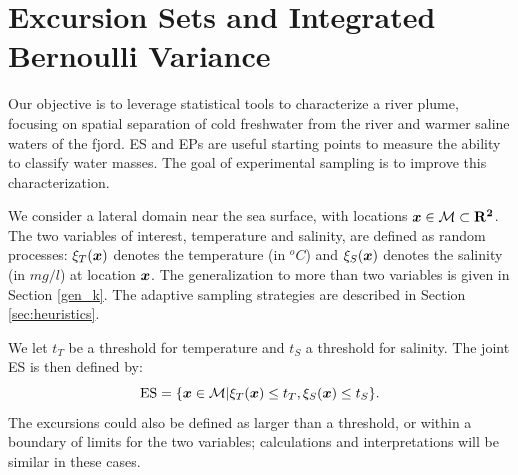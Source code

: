 \documentclass[aoas]{imsart}
\begin{document}






\section{Excursion Sets and Integrated Bernoulli Variance}
\label{sec:ESEP}

Our objective is to leverage statistical tools to characterize a river plume, focusing on spatial separation of cold freshwater from the river and warmer saline waters of the fjord. ES and EPs are useful starting points to measure the ability to classify water masses. The goal of experimental sampling is to improve this characterization. %

We consider a lateral domain near the sea surface, with locations
${\boldsymbol x} \in \mathcal{M} \subset \mathbf{R^2}$. The two variables of
interest, temperature and salinity, are defined as random processes:
$\xi_T({\boldsymbol x})$ denotes the temperature (in $^o C$) and $\xi_S({\boldsymbol x})$
denotes the salinity (in $mg/l$) at location ${\boldsymbol x}$. The generalization to more than two variables is given in Section \ref{gen_k}. The adaptive sampling strategies are described in Section \ref{sec:heuristics}.

We let $t_T$ be a threshold for temperature and $t_S$ a threshold for salinity. The joint ES is then defined by:
\begin{equation}\label{ES}
     \mbox{ES} = \{\bx \in \mathcal{M} | \xi_T(\bx) \leq t_T,\xi_S(\bx) \leq t_S\}.
\end{equation}
The excursions could also be defined as larger than a threshold, or
within a boundary of limits for the two variables; calculations and
interpretations will be similar in these cases.
\end{document}
